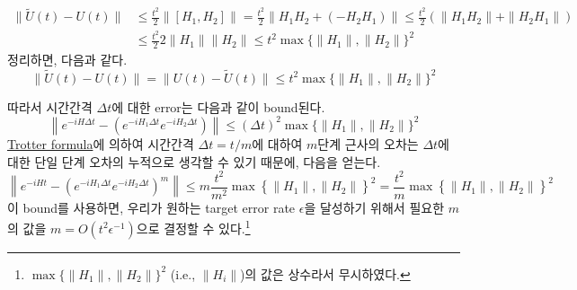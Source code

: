 \begin{align*}
  \|\tilde{U}(t)-U(t)\| &\leq \frac{t^2}{2} \left\|\left[H_1, H_2\right]\right\|  = \frac{t^2}{2} \left\|H_1H_2 + (-H_2H_1)\right\| \leq  \frac{t^2}{2} (\|H_1H_2\| + \| H_2H_1\|) \\
                        &\leq \frac{t^2}{2} 2\|H_1\| \|H_2\| \le t^2 \max\{\|H_1\|, \|H_2\|\}^2
\end{align*}
정리하면, 다음과 같다.
\begin{equation}
  \|\tilde{U}(t)-U(t)\| = \|{U}(t)- \tilde U(t)\|  \le t^2 \max\{\|H_1\|,\|H_2\|\}^2  \label{eq:bound}
\end{equation}

\vspace{1em}

따라서 시간간격 $\Delta t$에 대한 error는 다음과 같이 bound된다.
\begin{equation}
 \left\|e^{-i H \Delta t}-\left(e^{-i H_1  \Delta  t} e^{-i H_2 \Delta  t}\right)\right\| \le (\Delta t)^2 \max\{\|H_1\|,\|H_2\|\}^2  \label{eq:bound}
\end{equation}
\hyperref[thm:trotter-formula]{Trotter formula}에 의하여 시간간격 $\Delta t = t/m$에 대하여 $m$단계 근사의 오차는 $\Delta t$에 대한 단일 단계 오차의 누적으로 생각할 수 있기 때문에, 다음을 얻는다.
\begin{equation*}
  \left\|e^{-i H t}-\left(e^{-i H_1  \Delta t} e^{-i H_2 \Delta t}\right)^m\right\| \leq m \frac{t^2}{m^2} \max \left\{\left\|H_1\right\|,\left\|H_2\right\|\right\}^2=\frac{t^2}{m} \max \left\{\left\|H_1\right\|,\left\|H_2\right\|\right\}^2
\end{equation*}
이 bound를 사용하면, 우리가 원하는 target error rate $\epsilon$을 달성하기 위해서 필요한 $m$의 값을 $m = O(t^2 \epsilon^{-1})$으로 결정할 수 있다.\footnote{$\max \{\|H_1 \|, \|H_2 \|\}^2$ (i.e., $\|H_i\|$)의 값은 상수라서 무시하였다.}

